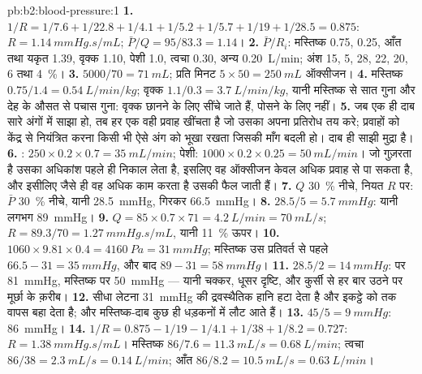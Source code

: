 \begin{solution}{pb:b2:blood-pressure:1}
\textbf{1.} $1/R = 1/7.6 + 1/22.8 + 1/4.1 + 1/5.2 + 1/5.7 + 1/19 +
1/28.5 = 0.875$: $R = \qty{1.14}{mmHg.s/mL}$; $\bar P/Q = 95/83.3 =
1.14$।
\textbf{2.} $\bar P/R_i$: मस्तिष्क 0.75,  0.25, आँत तथा यकृत
1.39, वृक्क 1.10, पेशी 1.0, त्वचा 0.30, अन्य \qty{0.20}{L/min};
अंश 15, 5, 28, 22, 20, 6 तथा \qty{4}{\%}।
\textbf{3.} $5000/70 = \qty{71}{mL}$; प्रति मिनट $5\times 50 = \qty{250}{mL}$
ऑक्सीजन।
\textbf{4.} मस्तिष्क $0.75/1.4 = \qty{0.54}{L/min/kg}$; वृक्क $1.1/0.3
= \qty{3.7}{L/min/kg}$, यानी मस्तिष्क से सात गुना और देह के
औसत से पचास गुना: वृक्क छानने के लिए सींचे जाते हैं, पोसने के लिए नहीं।
\textbf{5.} जब एक ही दाब सारे अंगों में साझा हो, तब हर एक वही
प्रवाह खींचता है जो उसका अपना प्रतिरोध तय करे; प्रवाहों को केंद्र से
नियंत्रित करना किसी भी ऐसे अंग को भूखा रखता जिसकी माँग बदली हो। दाब ही
साझी मुद्रा है।
\textbf{6.} : $250\times 0.2\times 0.7 = \qty{35}{mL/min}$;
पेशी: $1000\times 0.2\times 0.25 = \qty{50}{mL/min}$। 
जो गुज़रता है उसका अधिकांश पहले ही निकाल लेता है, इसलिए वह ऑक्सीजन केवल
अधिक प्रवाह से पा सकता है, और इसीलिए जैसे ही वह अधिक काम करता है उसकी  फैल जाती हैं।
\textbf{7.} $Q$ \qty{30}{\%} नीचे, नियत $R$ पर: $\bar P$
\qty{30}{\%} नीचे, यानी \qty{28.5}{mmHg}, गिरकर \qty{66.5}{mmHg}।
\textbf{8.} $28.5/5 = \qty{5.7}{mmHg}$: यानी लगभग \qty{89}{mmHg}।
\textbf{9.} $Q = 85\times 0.7\times 71 = \qty{4.2}{L/min} =
\qty{70}{mL/s}$; $R = 89.3/70 = \qty{1.27}{mmHg.s/mL}$, यानी
\qty{11}{\%} ऊपर।
\textbf{10.} $1060\times 9.81\times 0.4 = \qty{4160}{Pa} =
\qty{31}{mmHg}$; मस्तिष्क उस प्रतिवर्त से पहले $66.5 - 31 = \qty{35}{mmHg}$,
और बाद $89 - 31 = \qty{58}{mmHg}$।
\textbf{11.} $28.5/2 = \qty{14}{mmHg}$:  पर \qty{81}{mmHg},
मस्तिष्क पर \qty{50}{mmHg} --- यानी चक्कर, धूसर दृष्टि, और कुर्सी से
हर बार उठने पर मूर्छा के क़रीब।
\textbf{12.} सीधा लेटना \qty{31}{mmHg} की द्रवस्थैतिक हानि हटा देता है
और इकट्ठे  को  तक वापस बहा देता है;  और
मस्तिष्क-दाब कुछ ही धड़कनों में लौट आते हैं।
\textbf{13.} $45/5 = \qty{9}{mmHg}$: \qty{86}{mmHg}।
\textbf{14.} $1/R = 0.875 - 1/19 - 1/4.1 + 1/38 + 1/8.2 = 0.727$: $R =
\qty{1.38}{mmHg.s/mL}$। मस्तिष्क $86/7.6 = \qty{11.3}{mL/s} =
\qty{0.68}{L/min}$; त्वचा $86/38 = \qty{2.3}{mL/s} = \qty{0.14}{L/min}$;
आँत $86/8.2 = \qty{10.5}{mL/s} = \qty{0.63}{L/min}$।

\end{solution}
